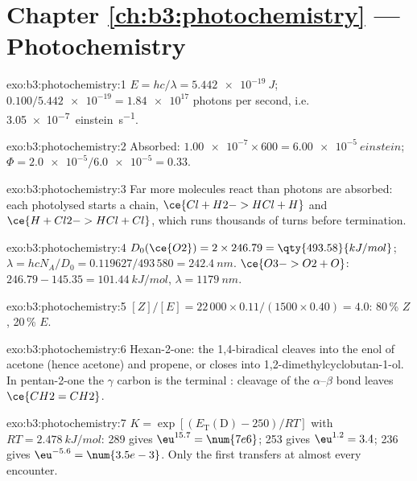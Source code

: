 \section*{Chapter \ref{ch:b3:photochemistry} --- Photochemistry}

\begin{solution}{exo:b3:photochemistry:1}
$E = hc/\lambda = \qty{5.442e-19}{J}$; $0.100/\num{5.442e-19} = \num{1.84e17}$ photons per second, i.e.
\qty{3.05e-7}{einstein.s^{-1}}.
\end{solution}

\begin{solution}{exo:b3:photochemistry:2}
Absorbed: $\num{1.00e-7} \times 600 = \qty{6.00e-5}{einstein}$; $\Phi = \num{2.0e-5}/\num{6.0e-5} = 0.33$.
\end{solution}

\begin{solution}{exo:b3:photochemistry:3}
Far more molecules react than photons are absorbed: each photolysed  starts a
chain, $\ce{Cl + H2 -> HCl + H}$ and $\ce{H + Cl2 -> HCl + Cl}$, which runs thousands of turns before
termination.
\end{solution}

\begin{solution}{exo:b3:photochemistry:4}
$D_0(\ce{O2}) = 2 \times 246.79 = \qty{493.58}{kJ/mol}$; $\lambda = hcN_A/D_0 = 0.119627/493\,580 =
\qty{242.4}{nm}$. $\ce{O3 -> O2 + O}$: $246.79 - 145.35 = \qty{101.44}{kJ/mol}$, $\lambda = \qty{1179}{nm}$.
\end{solution}

\begin{solution}{exo:b3:photochemistry:5}
$[Z]/[E] = 22\,000 \times 0.11/(1500 \times 0.40) = 4.0$: 80\,\% $Z$, 20\,\% $E$.
\end{solution}

\begin{solution}{exo:b3:photochemistry:6}
Hexan-2-one: the 1,4-biradical cleaves into the enol of acetone (hence acetone) and
propene, or closes into 1,2-dimethylcyclobutan-1-ol. In pentan-2-one the $\gamma$
carbon is the terminal : cleavage of the $\alpha$--$\beta$ bond leaves $\ce{CH2=CH2}$.
\end{solution}

\begin{solution}{exo:b3:photochemistry:7}
$K = \exp[(E_{\mathrm T}(\mathrm D) - 250)/RT]$ with $RT = \qty{2.478}{kJ/mol}$: 289 gives $\eu^{15.7} = \num{7e6}$;
253 gives $\eu^{1.2} = 3.4$; 236 gives $\eu^{-5.6} = \num{3.5e-3}$. Only the first transfers at almost
every encounter.
\end{solution}

